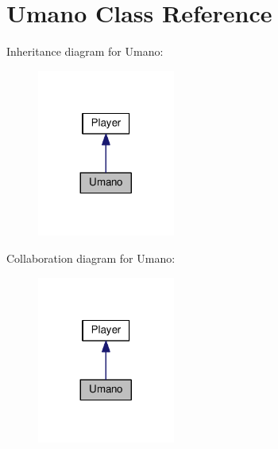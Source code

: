 \hypertarget{classUmano}{}\section{Umano Class Reference}
\label{classUmano}


Inheritance diagram for Umano\+:
\nopagebreak
\begin{figure}[H]
\begin{center}
\leavevmode
\includegraphics[width=128pt]{classUmano__inherit__graph}
\end{center}
\end{figure}


Collaboration diagram for Umano\+:
\nopagebreak
\begin{figure}[H]
\begin{center}
\leavevmode
\includegraphics[width=128pt]{classUmano__coll__graph}
\end{center}
\end{figure}
